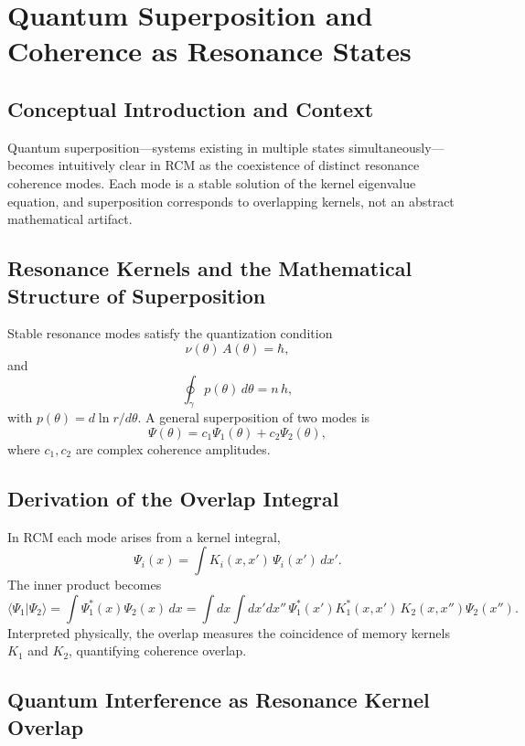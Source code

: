 \section{Quantum Superposition and Coherence as Resonance States}

\subsection{Conceptual Introduction and Context}

Quantum superposition—systems existing in multiple states simultaneously—becomes intuitively clear in RCM as the coexistence of distinct resonance coherence modes.  Each mode is a stable solution of the kernel eigenvalue equation, and superposition corresponds to overlapping kernels, not an abstract mathematical artifact.

\subsection{Resonance Kernels and the Mathematical Structure of Superposition}

Stable resonance modes satisfy the quantization condition
\begin{equation}\label{eq:quant_cond}
\nu(\theta)\,A(\theta)=\hbar,
\end{equation}
and
\begin{equation}\label{eq:loop_quant}
\oint_{\gamma}p(\theta)\,d\theta = n\,h,
\end{equation}
with \(p(\theta)=d\ln r/d\theta\).  A general superposition of two modes is
\begin{equation}\label{eq:psi_super}
\Psi(\theta)=c_1\Psi_1(\theta)+c_2\Psi_2(\theta),
\end{equation}
where \(c_1,c_2\) are complex coherence amplitudes.

\subsection{Derivation of the Overlap Integral}

In RCM each mode arises from a kernel integral,
\[
\Psi_i(x)=\int K_i(x,x')\,\Psi_i(x')\,dx'.
\]
The inner product becomes
\[
\langle\Psi_1|\Psi_2\rangle
=\int \Psi_1^*(x)\Psi_2(x)\,dx
=\int dx\!\int\!dx'dx''\,\Psi_1^*(x')K_1^*(x,x')\,K_2(x,x'')\Psi_2(x'').
\]
Interpreted physically, the overlap measures the coincidence of memory kernels \(K_1\) and \(K_2\), quantifying coherence overlap.

\subsection{Quantum Interference as Resonance Kernel Overlap}

